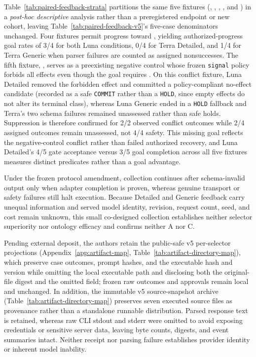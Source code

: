 \documentclass[journal]{IEEEtran}
\begin{document}
Table~\ref{tab:paired-feedback-strata} partitions the same five fixtures (, , , , and ) in a \emph{post-hoc descriptive} analysis rather than a preregistered endpoint or new cohort, leaving Table~\ref{tab:paired-feedback-v5}'s five-case denominators unchanged. Four fixtures permit progress toward , yielding authorized-progress goal rates of 3/4 for both Luna conditions, 0/4 for Terra Detailed, and 1/4 for Terra Generic when parser failures are counted as assigned nonsuccesses. The fifth fixture, , serves as a preexisting negative control whose frozen \texttt{signal} policy forbids all effects even though the goal requires . On this conflict fixture, Luna Detailed removed the forbidden effect and committed a policy-compliant no-effect candidate (recorded as a safe \texttt{COMMIT} rather than a \texttt{HOLD}, since empty effects do not alter its terminal class), whereas Luna Generic ended in a \texttt{HOLD} fallback and Terra's two schema failures remained unassessed rather than safe holds. Suppression is therefore confirmed for 2/2 observed conflict outcomes while 2/4 assigned outcomes remain unassessed, not 4/4 safety. This missing goal reflects the negative-control conflict rather than failed authorized recovery, and Luna Detailed's 4/5 gate acceptance versus 3/5 goal completion across all five fixtures measures distinct predicates rather than a goal advantage.


Under the frozen protocol amendment, collection continues after schema-invalid output only when adapter completion is proven, whereas genuine transport or safety failures still halt execution. Because Detailed and Generic feedback carry unequal information and served model identity, revision, request count, seed, and cost remain unknown, this small co-designed collection establishes neither selector superiority nor ontology efficacy and confirms neither A nor C.

Pending external deposit, the authors retain the public-safe v5 per-selector projections (Appendix~\ref{app:artifact-map}, Table~\ref{tab:artifact-directory-map}), which preserve case outcomes, prompt hashes, and the executable hash and version while omitting the local executable path and disclosing both the original-file digest and the omitted field; frozen raw outcomes and approvals remain local and unchanged. In addition, the immutable v5 source-snapshot archive (Table~\ref{tab:artifact-directory-map}) preserves seven executed source files as provenance rather than a standalone runnable distribution.
Parsed response text is retained, whereas raw CLI stdout and stderr were omitted to avoid exposing credentials or sensitive server data, leaving byte counts, digests, and event summaries intact. Neither receipt nor parsing failure establishes provider identity or inherent model inability.
\end{document}
